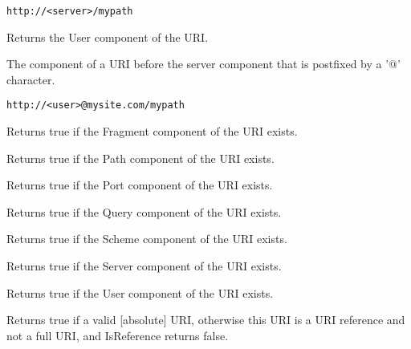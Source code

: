 \tt{http://<server>/mypath}


\label{wxurigetuser}


Returns the User component of the URI.

The component of a URI before the server component
that is postfixed by a '@' character.

\tt{http://<user>@mysite.com/mypath}

\label{wxurihasfragment}


Returns true if the Fragment component of the URI exists.

\label{wxurihaspath}


Returns true if the Path component of the URI exists.

\label{wxurihasport}


Returns true if the Port component of the URI exists.


\label{wxurihasquery}


Returns true if the Query component of the URI exists.


\label{wxurihasscheme}


Returns true if the Scheme component of the URI exists.


\label{wxurihasserver}


Returns true if the Server component of the URI exists.


\label{wxurihasuser}


Returns true if the User component of the URI exists.


\label{wxuriisreference}


Returns true if a valid [absolute] URI, otherwise this URI
is a URI reference and not a full URI, and IsReference
returns false.


